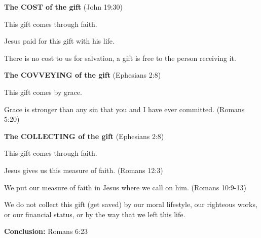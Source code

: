 \begin{compactenum}[I.]
\begin{compactenum}[A.]
	\end{compactenum}
    \item \textbf{The COST of the gift}  (John 19:30)
    \begin{compactenum}[A.]
    	\item This gift comes through faith.
    	    \begin{compactenum}[1.]
		    	\item Jesus paid for this gift with his life.
		    	\item There is no cost to us for salvation, a gift is free to the person receiving it.
		    \end{compactenum}
	\end{compactenum}
	\item \textbf{The COVVEYING of the gift}  (Ephesians 2:8)
    \begin{compactenum}[A.]
    	\item This gift comes by grace.
    	\begin{compactenum}[1.]
    		\item Grace is stronger than any sin that you and I have ever committed.   (Romans 5:20)
    	\end{compactenum}
	\end{compactenum}
    \item \textbf{The COLLECTING of the gift}  (Ephesians 2:8)
    \begin{compactenum}[A.]
    	\item This gift comes through faith.
    	    \begin{compactenum}[1.]
		    	\item Jesus gives us this measure of faith.  (Romans 12:3)
		    	\item We put our measure of faith in Jesus where we call on him.  (Romans 10:9-13)
		    \end{compactenum}
    	\item We do not collect this gift (get saved) by our moral lifestyle, our righteous works, or our financial status, or by the way that we left this life.
    \end{compactenum}
\end{compactenum}
\textbf{Conclusion: }  Romans 6:23


